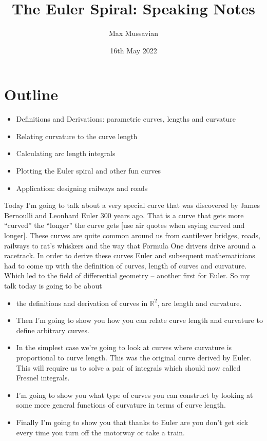 \documentclass[12pt]{article} %
\title{The Euler Spiral: Speaking Notes}
\author{Max Mussavian}
\theoremstyle{definition}
\theoremstyle{theorem}
\begin{document}
	\date{16th May 2022}
    \maketitle
\section{Outline}
\begin{tcolorbox}
	\begin{itemize}
		\item Definitions and Derivations: parametric curves, lengths and curvature
		\item Relating curvature to the curve length
		\item Calculating arc length integrals
		\item Plotting the Euler spiral and other fun curves
		\item Application: designing railways and roads
	\end{itemize}
\end{tcolorbox}
Today I'm going to talk about a very special curve that was discovered by James Bernoulli and Leonhard Euler 300 years ago. That is a curve that gets more “curved” the “longer” the curve gets [use air quotes when saying curved and longer]. 
These curves are quite common around us from cantilever bridges, roads, railways to rat’s whiskers and the way that Formula One drivers drive around a racetrack. In order to derive these curves Euler and subsequent mathematicians had to come up with the definition of curves, length of curves and curvature. Which led to the field of differential geometry -- another first for Euler.
So my talk today is going to be about
\begin{itemize}
\item	the definitions and derivation of curves in $\mathbb{R}^2$, arc length and curvature.
\item Then I'm going to show you how you can relate curve length and curvature to define arbitrary curves.
\item In the simplest case we're going to look at curves where curvature is proportional to curve length. This was the original curve derived by Euler. This will require us to solve a pair of integrals which should now called Fresnel integrals.
\item I'm going to show you what type of curves you can construct by looking at some more general functions of curvature in terms of curve length.
\item Finally I'm going to show you that thanks to Euler are you don't get sick every time you turn off the motorway or take a train.
\end{itemize}
\end{document}

